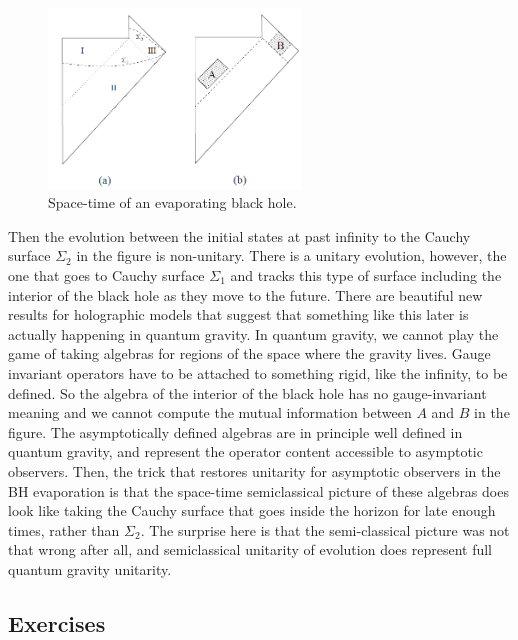 \documentclass[11pt]{article}
\numberwithin{equation}{section}
\begin{document}
\begin{figure}[t]
\begin{center}  
\includegraphics[width=0.6\textwidth]{imagen2.png}
\captionsetup{width=0.9\textwidth}
\caption{Space-time of an evaporating black hole.}
\label{bibo}
\end{center}  
\end{figure}   


Then the evolution between the initial states at past infinity to the Cauchy surface $\Sigma_2$ in the figure is non-unitary. There is a unitary evolution, however, the one that goes to Cauchy surface $\Sigma_1$ and tracks this type of surface including the interior of the black hole as they move to the future. There are beautiful new results for holographic models that suggest that something like this later is actually happening in quantum gravity. In quantum gravity, we cannot play the game of taking algebras for regions of the space where the gravity lives. Gauge invariant operators have to be attached to something rigid, like the infinity, to be defined. So the algebra of the interior of the black hole has no gauge-invariant meaning and we cannot compute the mutual information between $A$ and $B$ in the figure. The asymptotically defined algebras are in principle well defined in quantum gravity, and represent the operator content accessible to asymptotic observers. Then, the trick that restores unitarity for asymptotic observers in the BH evaporation is that the space-time semiclassical picture of these algebras does look like taking the Cauchy surface that goes inside the horizon for late enough times, rather than $\Sigma_2$. The surprise here is that the semi-classical picture was not that wrong after all, and semiclassical unitarity of evolution does represent full quantum gravity unitarity.      

\subsection{Exercises}
\end{document}
